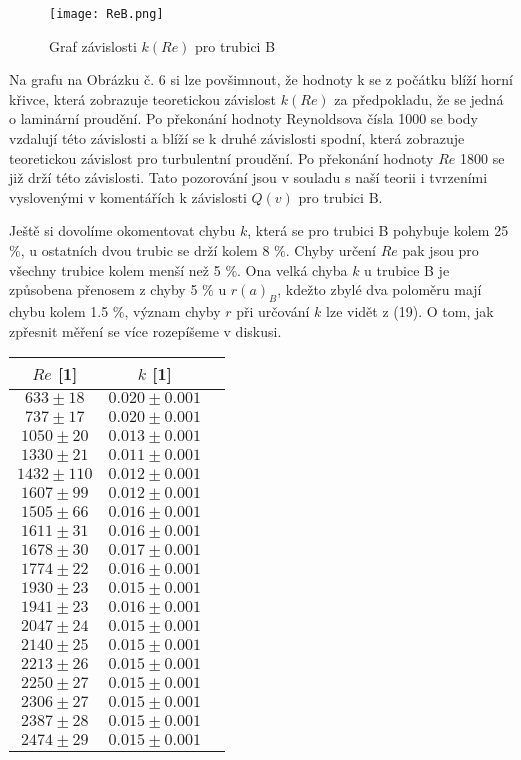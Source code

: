 \documentclass[a4paper]{article}
\begin{document}
\begin{figure}[H]
\centering
\texttt{[image: ReB.png]}
\caption{Graf závislosti $k(Re)$ pro trubici B}
\end{figure}
\par Na grafu na Obrázku č. 6 si lze povšimnout, že hodnoty k se z počátku blíží horní křivce, která zobrazuje teoretickou závislost $k(Re)$ za předpokladu, že se jedná o laminární proudění. Po překonání hodnoty Reynoldsova čísla 1000 se body vzdalují této závislosti a blíží se k druhé závislosti spodní, která zobrazuje teoretickou závislost pro turbulentní proudění. Po překonání hodnoty $Re$ 1800 se již drží této závislosti. Tato pozorování jsou v souladu s naší teorii i tvrzeními vyslovenými v komentářích k závislosti $Q(v)$ pro trubici B.
\par Ještě si dovolíme okomentovat chybu $k$, která se pro trubici B pohybuje kolem 25 $\%$, u ostatních dvou trubic se drží kolem 8 $\%$. Chyby určení $Re$ pak jsou pro všechny trubice kolem menší než 5 $\%$. Ona velká chyba $k$ u trubice B je způsobena přenosem z chyby 5 $\%$ u $r(a)_{B}$, kdežto zbylé dva poloměru mají chybu kolem 1.5 $\%$, význam chyby  $r$ při určování $k$ lze vidět z (19). O tom, jak zpřesnit měření se více rozepíšeme v diskusi.
\begin{center}
    \label{tab:title}
    \begin{tabular}{ | c | c |  p{3cm} |} \hline
    $Re$ [1] & $k$ [1]    \\ \hline
    $633  \pm 18$  & $0.020\pm0.001$ \\ \hline
    $737  \pm 17$  & $0.020\pm0.001$ \\ \hline
    $1050 \pm 20$  & $0.013\pm0.001$ \\ \hline
    $1330 \pm 21$  & $0.011\pm0.001$ \\ \hline
    $1432 \pm 110$ & $0.012\pm0.001$ \\ \hline
    $1607 \pm 99$  & $0.012\pm0.001$ \\ \hline
    $1505 \pm 66$  & $0.016\pm0.001$ \\ \hline
    $1611 \pm 31$  & $0.016\pm0.001$ \\ \hline
    $1678 \pm 30$  & $0.017\pm0.001$ \\ \hline
    $1774 \pm 22$  & $0.016\pm0.001$ \\ \hline
    $1930 \pm 23$  & $0.015\pm0.001$ \\ \hline
    $1941 \pm 23$  & $0.016\pm0.001$ \\ \hline
    $2047 \pm 24$  & $0.015\pm0.001$ \\ \hline
    $2140 \pm 25$  & $0.015\pm0.001$ \\ \hline
    $2213 \pm 26$  & $0.015\pm0.001$ \\ \hline
    $2250 \pm 27$  & $0.015\pm0.001$ \\ \hline
    $2306 \pm 27$  & $0.015\pm0.001$ \\ \hline
    $2387 \pm 28$  & $0.015\pm0.001$ \\ \hline
    $2474\pm29$  & $0.015\pm0.001$ \\ \hline
\end{tabular}
\end{center}
\end{document}
